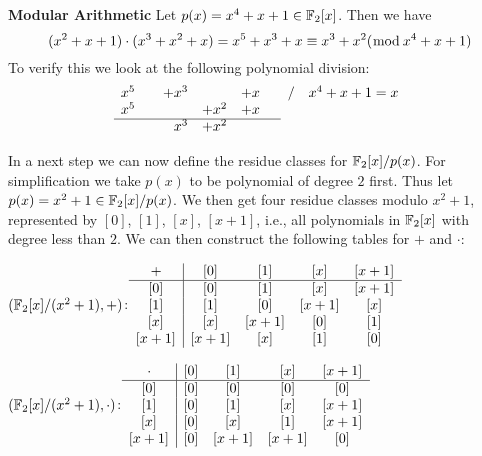 \textbf{Modular Arithmetic}\quad
Let $p(x)=x^4+x+1\in\ftwox$. Then we have \vspace{-.1cm}
\[\modulo{(x^2+x+1)\cdot(x^3+x^2+x)= x^5+x^3+x}{x^4+x+1}{x^3+x^2}\]\vspace{-.0cm}
To verify this we look at the following polynomial division:\vspace{-.0cm}
\[\begin{array}{rrrrrrrcccc}
  x^5 & & +x^3 & & +x& & / & x^4+x+1 = x \\
  x^5 & &      &+x^2& +x \\\cline{1-6}
  & & x^3     &+x^2& \\
\end{array}\]\vspace{-.25cm}

In a next step we can now define the residue classes for \textbf{$\ftwoxpx$}.
For simplification we take $p(x)$ to be polynomial of degree $2$ first. Thus let
$p(x)=x^2+1\in\ftwoxpx$. We then get four residue classes modulo $x^2+1$,
represented by $[0]$, $[1]$, $[x]$, $[x+1]$, i.e., all polynomials in $\ftwox$
with degree less than $2$. We can then construct the following tables for $+$
and $\cdot$:

\begin{minipage}{.5\textwidth}
\begin{center}
  {$(\ftwox/(x^2+1),+)$:}\newline $\begin{array}{c|cccc} +
             &\rcl{0}{}&\rcl{1}{}&\rcl{x}{}&\rcl{x+1}{}\\\hline
    \rcl{0}{}&\rcl{0}{}&\rcl{1}{}&\rcl{x}{}&\rcl{x+1}{}\\
    \rcl{1}{}&\rcl{1}{}&\rcl{0}{}&\rcl{x+1}{}&\rcl{x}{}\\
    \rcl{x}{}&\rcl{x}{}&\rcl{x+1}{}&\rcl{0}{}&\rcl{1}{}\\
    \rcl{x+1}{}&\rcl{x+1}{}&\rcl{x}{}&\rcl{1}{}&\rcl{0}{}\\
  \end{array}$
\end{center}
\end{minipage}
\begin{minipage}{.5\textwidth}
\begin{center}
  {$(\ftwox/(x^2+1),\cdot)$:}\newline $\begin{array}{c|cccc} \cdot
    &\rcl{0}{}&\rcl{1}{}&\rcl{x}{}&\rcl{x+1}{}\\\hline
    \rcl{0}{}&\rcl{0}{}&\rcl{0}{}&\rcl{0}{}&\rcl{0}{}\\
    \rcl{1}{}&\rcl{0}{}&\rcl{1}{}&\rcl{x}{}&\rcl{x+1}{}\\
    \rcl{x}{}&\rcl{0}{}&\rcl{x}{}&\rcl{1}{}&\rcl{x+1}{}\\
    \rcl{x+1}{}&\rcl{0}{}&\rcl{x+1}{}&\rcl{x+1}{}&\rcl{0}{}\\
  \end{array}$
\end{center}
\end{minipage}

